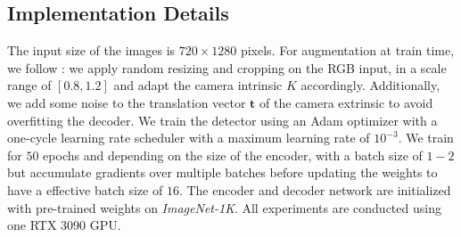 \documentclass[10pt,twocolumn,letterpaper]{article}
\begin{document}

\subsection{Implementation Details}
The input size of the images is $720 \times 1280$ pixels. For augmentation at train time, we follow \cite{harley2022simple, hou2021multiview}: we apply random resizing and cropping on the RGB input, in a scale range of $[0.8, 1.2]$ and adapt the camera intrinsic $K$ accordingly. Additionally, we add some noise to the translation vector $\bm{t}$ of the camera extrinsic to avoid overfitting the decoder. 
We train the detector using an Adam optimizer with a one-cycle learning rate scheduler with a maximum learning rate of $10^{-3}$. We train for $50$ epochs and depending on the size of the encoder, with a batch size of $1-2$ but accumulate gradients over multiple batches before updating the weights to have a effective batch size of $16$. The encoder and decoder network are initialized with pre-trained weights on \textit{ImageNet-1K}.
All experiments are conducted using one RTX 3090 GPU.
\end{document}
